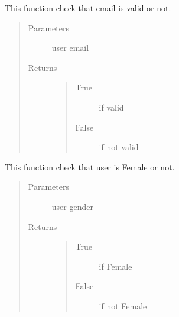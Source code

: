 \documentclass[letterpaper,10pt,english]{sphinxmanual}
\begin{document}

\begin{fulllineitems}
\label{\detokenize{janta:janta.viewhelper.is_email}}
This function check that email is valid or not.
\begin{quote}\begin{description}
\item[{Parameters}] \leavevmode
{} \textendash{} user email

\item[{Returns}] \leavevmode
\begin{quote}\begin{description}
\item[{True}] \leavevmode
if valid

\item[{False}] \leavevmode
if not valid

\end{description}\end{quote}


\end{description}\end{quote}

\end{fulllineitems}


\begin{fulllineitems}
\label{\detokenize{janta:janta.viewhelper.is_female}}
This function check that user  is Female or not.
\begin{quote}\begin{description}
\item[{Parameters}] \leavevmode
{} \textendash{} user gender

\item[{Returns}] \leavevmode
\begin{quote}\begin{description}
\item[{True}] \leavevmode
if Female

\item[{False}] \leavevmode
if not Female

\end{description}\end{quote}


\end{description}\end{quote}

\end{fulllineitems}
\end{document}
